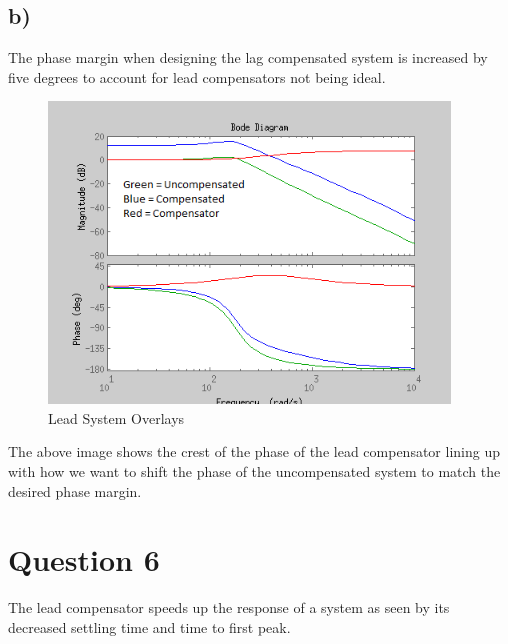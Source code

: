 \documentclass{article}
\begin{document}
\subsection{b)} %
\label{sub:b_}
The phase margin when designing the lag compensated system is increased by five degrees to account for lead compensators not being ideal.
\begin{figure}[!htbp]
    \centering
    \includegraphics[width=0.95\textwidth]{lead_overlays.png}
    \caption{Lead System Overlays}
\end{figure}
The above image shows the crest of the phase of the lead compensator lining up with how we want to shift the phase of the uncompensated system to match the desired phase margin.




\section{Question 6} %
\label{sec:question_6}
The lead compensator speeds up the response of a system as seen by its decreased settling time and time to first peak.
\end{document}
